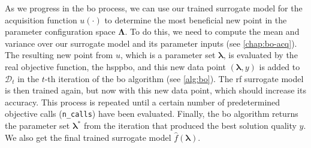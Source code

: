 As we progress in the \gls{bo} process, we can use our trained surrogate model for the acquisition function $u(\cdot)$ to determine the most beneficial new point in the parameter configuration space $\mathbf{\Lambda}$. To do this, we need to compute the mean and variance over our surrogate model and its parameter inputs (see \cref{chap:bo-acq}). The resulting new point from $u$, which is a parameter set $\mathbf{\lambda}$, is evaluated by the real objective function, the \gls{hsppbo}, and this new data point $(\mathbf{\lambda}, y)$ is added to $\mathcal{D}_t$ in the $t$-th iteration of the \gls{bo} algorithm (see \cref{alg:bo}). The \gls{rf} surrogate model is then trained again, but now with this new data point, which should increase its accuracy. This process is repeated until a certain number of predetermined objective calls (\texttt{n\_calls}) have been evaluated. Finally, the \gls{bo} algorithm returns the parameter set $\mathbf{\lambda}^*$ from the iteration that produced the best solution quality $y$. We also get the final trained surrogate model $\hat{f}(\mathbf{\lambda})$.